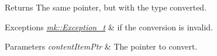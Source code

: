 \begin{DoxyReturn}{Returns}
The same pointer, but with the type converted.
\end{DoxyReturn}

\begin{DoxyExceptions}{Exceptions}
{\em \hyperlink{classmk_1_1_exception__t}{mk\+::\+Exception\+\_\+t}} & if the conversion is invalid. \\
\hline
\end{DoxyExceptions}

\begin{DoxyParams}{Parameters}
{\em content\+Item\+Ptr} & The pointer to convert. \\
\hline
\end{DoxyParams}
